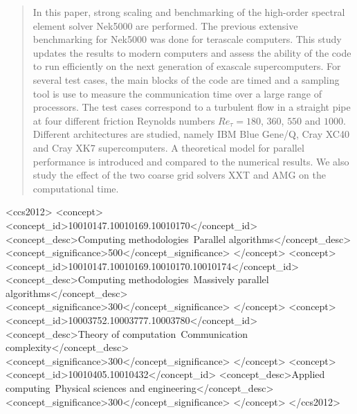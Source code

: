 \documentclass{sig-alternate}
\begin{document}
\maketitle
\begin{abstract}
In this paper, strong scaling and benchmarking of the high-order spectral element solver Nek5000 are performed. The previous extensive benchmarking for Nek5000 was done for terascale computers. This study updates the results to modern computers and assess the ability of the code to run efficiently on the next generation of exascale supercomputers. For several test cases, the main blocks of the code are timed and a sampling tool is use to measure the communication time over a large range of processors. The test cases correspond to a turbulent flow in a straight pipe at four different friction Reynolds numbers $Re_{\tau} = 180$, $360$, $550$ and $1000$. Different architectures are studied, namely IBM Blue Gene/Q, Cray XC40 and Cray XK7 supercomputers. A theoretical model for parallel performance is introduced and compared to the numerical results. We also study the effect of the two coarse grid solvers XXT and AMG on the computational time.
\end{abstract}


%
 \begin{CCSXML}
<ccs2012>
<concept>
<concept_id>10010147.10010169.10010170</concept_id>
<concept_desc>Computing methodologies~Parallel algorithms</concept_desc>
<concept_significance>500</concept_significance>
</concept>
<concept>
<concept_id>10010147.10010169.10010170.10010174</concept_id>
<concept_desc>Computing methodologies~Massively parallel algorithms</concept_desc>
<concept_significance>300</concept_significance>
</concept>
<concept>
<concept_id>10003752.10003777.10003780</concept_id>
<concept_desc>Theory of computation~Communication complexity</concept_desc>
<concept_significance>300</concept_significance>
</concept>
<concept>
<concept_id>10010405.10010432</concept_id>
<concept_desc>Applied computing~Physical sciences and engineering</concept_desc>
<concept_significance>300</concept_significance>
</concept>
</ccs2012>
\end{CCSXML}

\end{document}
